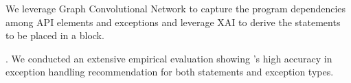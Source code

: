    We
  leverage Graph Convolutional Network to capture the program
  dependencies among API elements and exceptions and leverage XAI
  to derive the statements to be placed in a  block.

. We conducted an extensive
empirical evaluation showing {\tool}'s high accuracy in exception
handling recommendation for both statements and exception types.

  
